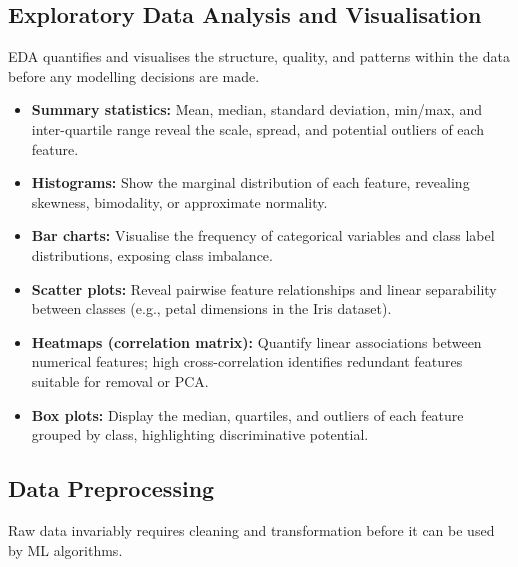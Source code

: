 \documentclass[12pt,a4paper]{article}
\begin{document}
\subsection{Exploratory Data Analysis and Visualisation}

EDA quantifies and visualises the structure, quality, and patterns within the data before
any modelling decisions are made.

\begin{itemize}[noitemsep]
  \item \textbf{Summary statistics:} Mean, median, standard deviation, min/max, and
        inter-quartile range reveal the scale, spread, and potential outliers of each feature.
  \item \textbf{Histograms:} Show the marginal distribution of each feature, revealing
        skewness, bimodality, or approximate normality.
  \item \textbf{Bar charts:} Visualise the frequency of categorical variables and
        class label distributions, exposing class imbalance.
  \item \textbf{Scatter plots:} Reveal pairwise feature relationships and linear separability
        between classes (e.g., petal dimensions in the Iris dataset).
  \item \textbf{Heatmaps (correlation matrix):} Quantify linear associations between
        numerical features; high cross-correlation identifies redundant features suitable
        for removal or PCA.
  \item \textbf{Box plots:} Display the median, quartiles, and outliers of each feature
        grouped by class, highlighting discriminative potential.
\end{itemize}

\subsection{Data Preprocessing}

Raw data invariably requires cleaning and transformation before it can be used by ML algorithms.
\end{document}

